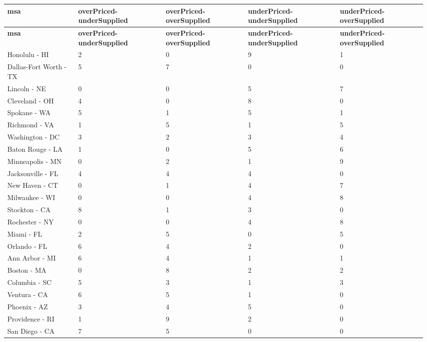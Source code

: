 \documentclass[sn-mathphys-num]{sn-jnl}%
\begin{document}
\begin{center}
	
	\begin{longtable*}{|p{3.75cm}|p{2.5cm}|p{2.5cm}|p{2.5cm}|p{2.5cm}|}  %
		\hline
		\textbf{msa} & \textbf{overPriced-underSupplied} & \textbf{overPriced-overSupplied} & \textbf{underPriced-underSupplied} & \textbf{underPriced-overSupplied} \\
		\hline
		\endfirsthead
		
		\hline
		\textbf{msa} & \textbf{overPriced-underSupplied} & \textbf{overPriced-overSupplied} & \textbf{underPriced-underSupplied} & \textbf{underPriced-overSupplied} \\
		\hline
		\endhead
		
		\hline
		\endfoot
		
		
		Honolulu - HI & 2 & 0 & 9 & 1 \\
		Dallas-Fort Worth - TX & 5 & 7 & 0 & 0 \\
		Lincoln - NE & 0 & 0 & 5 & 7 \\
		Cleveland - OH & 4 & 0 & 8 & 0 \\
		Spokane - WA & 5 & 1 & 5 & 1 \\
		Richmond - VA & 1 & 5 & 1 & 5 \\
		Washington - DC & 3 & 2 & 3 & 4 \\
		Baton Rouge - LA & 1 & 0 & 5 & 6 \\
		Minneapolis - MN & 0 & 2 & 1 & 9 \\
		Jacksonville - FL & 4 & 4 & 4 & 0 \\
		New Haven - CT & 0 & 1 & 4 & 7 \\
		Milwaukee - WI & 0 & 0 & 4 & 8 \\
		Stockton - CA & 8 & 1 & 3 & 0 \\
		Rochester - NY & 0 & 0 & 4 & 8 \\
		Miami - FL & 2 & 5 & 0 & 5 \\
		Orlando - FL & 6 & 4 & 2 & 0 \\
		Ann Arbor - MI & 6 & 4 & 1 & 1 \\
		Boston - MA & 0 & 8 & 2 & 2 \\
		Columbia - SC & 5 & 3 & 1 & 3 \\
		Ventura - CA & 6 & 5 & 1 & 0 \\
		Phoenix - AZ & 3 & 4 & 5 & 0 \\
		Providence - RI & 1 & 9 & 2 & 0 \\
		San Diego - CA & 7 & 5 & 0 & 0 \\

\end{longtable*}
\end{center}
\end{document}
